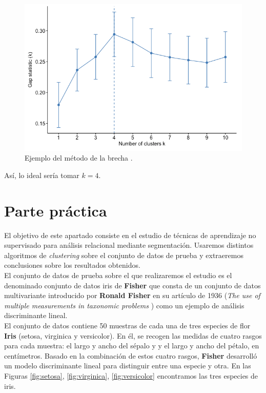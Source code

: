 \documentclass[a4paper, 20pt]{article}
\begin{document}
\begin{figure}[H]
	\centering
	\includegraphics[scale=0.4]{pedro/gapGraph}
	\caption{Ejemplo del método de la brecha \cite{gapGraph}.}
        \label{fig:gap}
\end{figure}
Así, lo ideal sería tomar $ k = 4 $.

\section{Parte práctica}\label{sec:practica}

El objetivo de este apartado consiste en el estudio de técnicas de aprendizaje no supervisado para análisis relacional mediante segmentación. Usaremos distintos algoritmos de \textit{clustering} sobre el conjunto de datos de prueba y extraeremos conclusiones sobre los resultados obtenidos.\\

El conjunto de datos de prueba sobre el que realizaremos el estudio es el denominado conjunto de datos iris de \textbf{Fisher} \cite{noauthor_uci_nodate} que consta de un conjunto de datos multivariante introducido por \textbf{Ronald Fisher} en su artículo de 1936 (\textit{The use of multiple measurements in taxonomic problems} \cite{fisher_use_1936}) como un ejemplo de análisis discriminante lineal.\\

El conjunto de datos contiene 50 muestras de cada una de tres especies de flor \textbf{Iris} (setosa, virginica y versicolor). En él, se recogen las medidas de cuatro rasgos para cada muestra: el largo y ancho del sépalo y y el largo y ancho del pétalo, en centímetros. Basado en la combinación de estos cuatro rasgos, \textbf{Fisher} desarrolló un modelo discriminante lineal para distinguir entre una especie y otra. En las Figuras \ref{fig:setosa}, \ref{fig:virginica}, \ref{fig:versicolor} encontramos las tres especies de iris.\\
\end{document}
